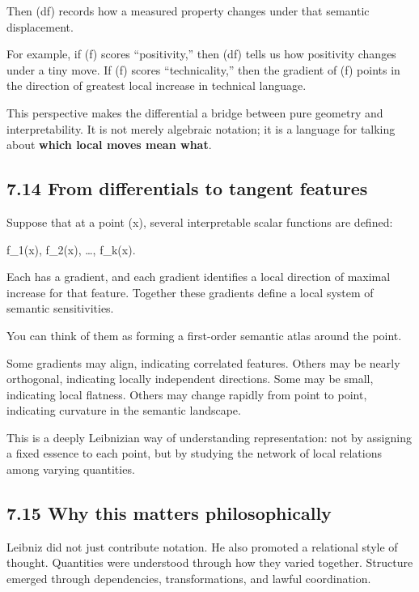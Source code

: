 \documentclass[
]{article}
\begin{document}
Then (df) records how a measured property changes under that semantic
displacement.

For example, if (f) scores ``positivity,'' then (df) tells us how
positivity changes under a tiny move. If (f) scores ``technicality,''
then the gradient of (f) points in the direction of greatest local
increase in technical language.

This perspective makes the differential a bridge between pure geometry
and interpretability. It is not merely algebraic notation; it is a
language for talking about \textbf{which local moves mean what}.

\hypertarget{from-differentials-to-tangent-features}{%
\subsection{7.14 From differentials to tangent
features}\label{from-differentials-to-tangent-features}}

Suppose that at a point (x), several interpretable scalar functions are
defined:

f\_1(x), f\_2(x), \dots, f\_k(x).

Each has a gradient, and each gradient identifies a local direction of
maximal increase for that feature. Together these gradients define a
local system of semantic sensitivities.

You can think of them as forming a first-order semantic atlas around the
point.

Some gradients may align, indicating correlated features. Others may be
nearly orthogonal, indicating locally independent directions. Some may
be small, indicating local flatness. Others may change rapidly from
point to point, indicating curvature in the semantic landscape.

This is a deeply Leibnizian way of understanding representation: not by
assigning a fixed essence to each point, but by studying the network of
local relations among varying quantities.

\hypertarget{why-this-matters-philosophically}{%
\subsection{7.15 Why this matters
philosophically}\label{why-this-matters-philosophically}}

Leibniz did not just contribute notation. He also promoted a relational
style of thought. Quantities were understood through how they varied
together. Structure emerged through dependencies, transformations, and
lawful coordination.
\end{document}

